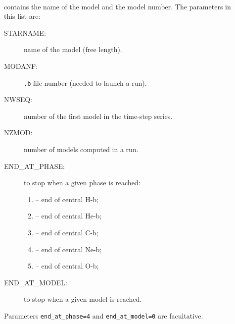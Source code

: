 \documentclass[11pt]{article}
\begin{document}
\begin{description}
  \item[] ~\\ contains the name of the model and the model number. The parameters in this list are:
    \begin{description}
      \item[STARNAME:] name of the model (free length).
      \item[MODANF:] \texttt{.b} file number (needed to launch a run).
      \item[NWSEQ:] number of the first model in the time-step series.
      \item[NZMOD:] number of models computed in a run.
      \item[END\_AT\_PHASE:] to stop when a given phase is reached:
         \begin{enumerate}[labelindent=.5cm,font=\ttfamily \bfseries,label=\arabic*:]
          \item[2] -- end of central H-b;
          \item[3] -- end of central He-b;
          \item[4] -- end of central C-b;
          \item[5] -- end of central Ne-b;
          \item[6] -- end of central O-b;
        \end{enumerate}
      \item[END\_AT\_MODEL:] to stop when a given model is reached.
    \end{description}
    Parameters \texttt{end\_at\_phase=4} and \texttt{end\_at\_model=0} are facultative.


\end{description}
\end{document}
